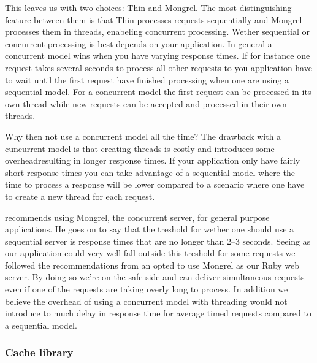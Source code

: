This leaves us with two choices: Thin and Mongrel. The most distinguishing
feature between them is that Thin processes requests sequentially and Mongrel
processes them in threads, enabeling concurrent processing. Wether
sequential or concurrent processing is best depends on your application.
In general a concurrent model wins when you have varying response times.
If for instance one request takes several seconds to process all other
requests to you application have to wait until the first request have
finished processing when one are using a sequential model. For a concurrent
model the first request can be processed in its own thread while new requests
can be accepted and processed in their own threads.

Why then not use a concurrent model all the time? The drawback with a
cuncurrent model is that creating threads is costly and introduces some
overhead\dash{}resulting in longer response times. If your application
only have fairly short response times you can take advantage of a
sequential model where the time to process a response will be lower compared
to a scenario where one have to create a new thread for each request.

\citet{zygmuntowicz08} recommends using Mongrel, the concurrent server,
for general purpose applications. He goes on to say that the treshold
for wether one should use a sequential server is response times that
are no longer than 2--3 seconds. Seeing as our application could very
well fall outside this treshold for some requests%
we followed the recommendations from \citeauthor{zygmuntowicz08} an opted
to use Mongrel as our Ruby web server. By doing so we're on the safe side
and can deliver simultaneous requests even if one of the requests are taking
overly long to process. In addition we believe the overhead of using a
concurrent model with threading would not introduce to much delay in
response time for average timed requests compared to a sequential model.

\subsubsection{Cache library}
\label{section:selection.stack.server.cache}

